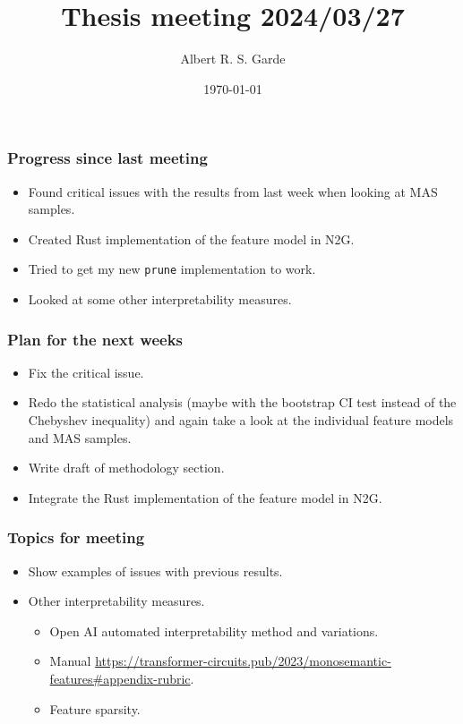 \documentclass[aspectratio=169]{beamer}
\title{Thesis meeting 2024/03/27}
\author{Albert R. S. Garde}
\date{\today}
\begin{document}
\frame{
	\maketitle
}

\begin{frame}[fragile=singleslide]
	\frametitle{Progress since last meeting}
    \begin{itemize}
        \item Found critical issues with the results from last week when looking at MAS samples.
        \item Created Rust implementation of the feature model in N2G.
        \item Tried to get my new \verb|prune| implementation to work.
        \item Looked at some other interpretability measures.
    \end{itemize}
\end{frame}
\begin{frame}[fragile=singleslide]
    \frametitle{Plan for the next weeks}
    \begin{itemize}
        \item Fix the critical issue.
        \item Redo the statistical analysis 
        (maybe with the bootstrap CI test instead of the Chebyshev inequality) 
        and again take a look at the individual feature models and MAS samples.
        \item Write draft of methodology section.
        \item Integrate the Rust implementation of the feature model in N2G.
    \end{itemize}
\end{frame}
\begin{frame}[fragile=singleslide]
    \frametitle{Topics for meeting}
    \begin{itemize}
        \item Show examples of issues with previous results.
        \item Other interpretability measures.
        \begin{itemize}
            \item Open AI automated interpretability method and variations.
            \item Manual \url{https://transformer-circuits.pub/2023/monosemantic-features#appendix-rubric}.
            \item Feature sparsity.
        \end{itemize}
    \end{itemize}
\end{frame}
\end{document}
